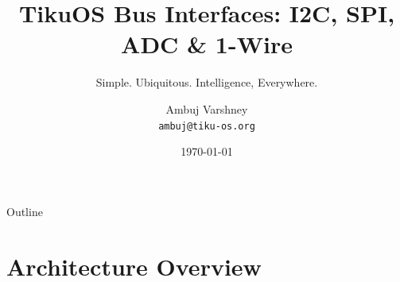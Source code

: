 \documentclass[aspectratio=169, 10pt]{beamer}
\title[TikuOS Bus Interfaces]{TikuOS Bus Interfaces: I2C, SPI, ADC \& 1-Wire}
\subtitle{Simple. Ubiquitous. Intelligence, Everywhere.}
\author[Ambuj Varshney]{Ambuj Varshney \\ \texttt{ambuj@tiku-os.org}}
\date{\today}
\begin{document}
\begin{frame}
\titlepage
\end{frame}

\begin{frame}{Outline}
\tableofcontents
\end{frame}

\section{Architecture Overview}
\end{document}
